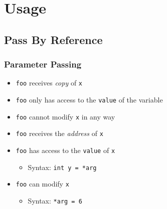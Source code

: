 \section{Usage}
\subsection{Pass By Reference}

\frame{\tableofcontents[currentsubsection]}


\begin{frame}
  \frametitle{Parameter Passing}
  \begin{overprint}


  \end{overprint}
  \vskip5mm
  \begin{overprint}
    \begin{itemize}
      \item {\tt foo} receives \emph{copy} of {\tt x}
      \item {\tt foo} only has access to the {\tt value} of the variable
      \item {\tt foo} cannot modify {\tt x} in any way
    \end{itemize}

    \begin{itemize}
      \item \texttt{foo} receives the \emph{address} of \texttt{x}
      \item \texttt{foo} has access to the {\tt value} of \texttt{x}
            \begin{itemize}
              \item Syntax: \texttt{int y = *arg}
            \end{itemize}
      \item \texttt{foo} can modify {\tt x}
            \begin{itemize}
              \item Syntax: \texttt{*arg = 6}
            \end{itemize}
    \end{itemize}


\end{overprint}
\end{frame}
